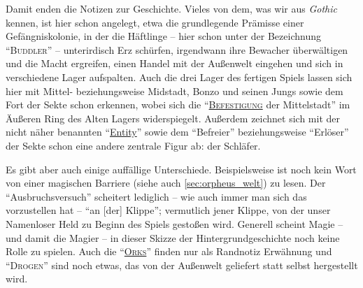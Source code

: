\documentclass[a5paper,pagesize,numbers=noenddot]{scrbook}
\begin{document}
Damit enden die Notizen zur Geschichte.
Vieles von dem, was wir aus \textit{Gothic} kennen, ist hier schon angelegt, etwa die grundlegende Prämisse einer Gefängniskolonie, in der die Häftlinge -- hier schon unter der Bezeichnung \enquote{\textsc{Buddler}} -- unterirdisch Erz schürfen, irgendwann ihre Bewacher überwältigen und die Macht ergreifen, einen Handel mit der Außenwelt eingehen und sich in verschiedene Lager aufspalten.
Auch die drei Lager des fertigen Spiels lassen sich hier mit Mittel- beziehungsweise Midstadt, Bonzo und seinen Jungs sowie dem Fort der Sekte schon erkennen, wobei sich die \enquote{\textsc{\uline{Befestigung}} der Mittelstadt} im Äußeren Ring des Alten Lagers widerspiegelt.
Außerdem zeichnet sich mit der nicht näher benannten \enquote{\uline{Entity}} sowie dem \enquote{Befreier} beziehungsweise \enquote{Erlöser} der Sekte schon eine andere zentrale Figur ab: der Schläfer.

Es gibt aber auch einige auffällige Unterschiede.
Beispielsweise ist noch kein Wort von einer magischen Barriere (siehe auch \autoref{sec:orpheus_welt}) zu lesen.
Der \enquote{Ausbruchsversuch} scheitert lediglich -- wie auch immer man sich das vorzustellen hat -- \enquote{an [der] Klippe}; vermutlich jener Klippe, von der unser Namenloser Held zu Beginn des Spiels gestoßen wird.
Generell scheint Magie -- und damit die Magier -- in dieser Skizze der Hintergrundgeschichte noch keine Rolle zu spielen.
Auch die \enquote{\textsc{\uline{Orks}}} finden nur als Randnotiz Erwähnung und \enquote{\textsc{Drogen}} sind noch etwas, das von der Außenwelt geliefert statt selbst hergestellt wird.


\end{document}
